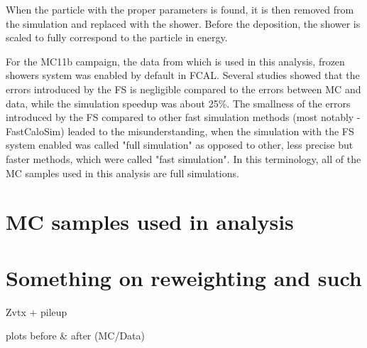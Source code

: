 When the particle with the proper parameters is found, it is then removed from the simulation and replaced with the shower. Before the deposition, the shower is scaled to fully correspond to the particle in energy.

\begin{figure}[htb]
\end{figure}

For the MC11b campaign, the data from which is used in this analysis, frozen showers system was enabled by default in FCAL. Several studies showed that the errors introduced by the FS is negligible compared to the errors between MC and data, while the simulation speedup was about 25\%. The smallness of the errors introduced by the FS compared to other fast simulation methods (most notably - FastCaloSim) leaded to the misunderstanding, when the simulation with the FS system enabled was called "full simulation" as opposed to other, less precise but faster methods, which were called "fast simulation". In this terminology, all of the MC samples used in this analysis are full simulations.

\section{MC samples used in analysis}
\label{sec:MC_periods}

\section{Something on reweighting and such}
\label{sec:MC_correction}

Zvtx + pileup

plots before \& after (MC/Data)
